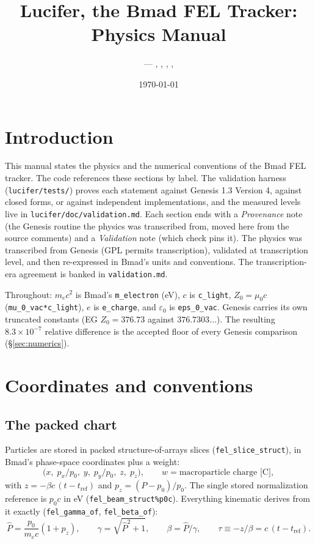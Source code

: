 \documentclass[11pt]{article}
\title{Lucifer, the Bmad FEL Tracker: Physics Manual}
\author{\code{lucifer} --- \code{fel\_beam\_mod}, \code{fel\_track\_mod},
        \code{fel\_collective\_mod}, \code{fel\_import\_mod}, \code{liblucifer}}
\date{\today}
\newcommand{\code}[1]{\texttt{#1}}
\begin{document}
\maketitle

\section{Introduction}\label{sec:intro}

This manual states the physics and the numerical conventions of the Bmad FEL tracker.
The code references these sections by label. The validation harness
(\code{lucifer/tests/}) proves each statement against Genesis 1.3 Version 4, against
closed forms, or against independent implementations, and the measured levels live in
\code{lucifer/doc/validation.md}. Each section ends with a \emph{Provenance} note (the Genesis
routine the physics was transcribed from, moved here from the source comments) and a
\emph{Validation} note (which check pins it). The physics was transcribed from Genesis
(GPL permits transcription), validated at transcription level, and then re-expressed in
Bmad's units and conventions. The transcription-era agreement is banked in \code{validation.md}.

Throughout: $m_e c^2$ is Bmad's \code{m\_electron} (eV), $c$ is \code{c\_light},
$Z_0 = \mu_0 c$ (\code{mu\_0\_vac*c\_light}), $e$ is \code{e\_charge}, and
$\varepsilon_0$ is \code{eps\_0\_vac}. Genesis carries its own truncated constants
(EG $Z_0 = 376.73$ against $376.7303\ldots$). The resulting $8.3\times10^{-7}$
relative difference is the accepted floor of every Genesis comparison
(\S\ref{sec:numerics}).

\section{Coordinates and conventions}\label{sec:coords}

\subsection{The packed chart}\label{sec:chart}

Particles are stored in packed structure-of-arrays slices (\code{fel\_slice\_struct}),
in Bmad's phase-space coordinates plus a weight:
\begin{equation}
  \bigl(x,\; p_x/p_0,\; y,\; p_y/p_0,\; z,\; p_z\bigr), \qquad
  w = \text{macroparticle charge [C]},
\end{equation}
with $z = -\beta c\,(t - t_{\mathrm{ref}})$ and $p_z = (P - p_0)/p_0$. The single stored
normalization reference is $p_0 c$ in eV (\code{fel\_beam\_struct\%p0c}). Everything
kinematic derives from it exactly (\code{fel\_gamma\_of}, \code{fel\_beta\_of}):
\begin{equation}\label{eq:kinematics}
  \hat P = \frac{p_0}{m_e c}(1+p_z), \qquad
  \gamma = \sqrt{\hat P^2 + 1}, \qquad
  \beta = \hat P/\gamma, \qquad
  \tau \equiv -z/\beta = c\,(t - t_{\mathrm{ref}}).
\end{equation}
\end{document}
